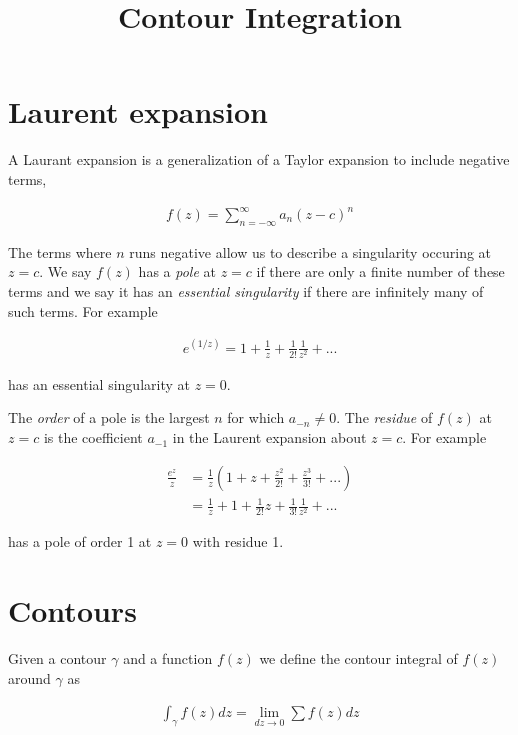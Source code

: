 \documentclass{article}
\title{Contour Integration}
\date{}
\begin{document}
\maketitle

\section{Laurent expansion}

A Laurant expansion is a generalization of a Taylor expansion to include negative terms, 

\begin{align}
f(z) = \displaystyle\sum\limits_{n=-\infty}^{\infty} a_n(z-c)^n
\end{align}

The terms where $n$ runs negative allow us to describe a singularity occuring at $z=c$. We say $f(z)$ has a \emph{pole} at $z=c$ if there are only a finite number of these terms and we say it has an \emph{essential singularity} if there are infinitely many of such terms. For example

\begin{align}
e^{(1/z)} = 1 + \frac{1}{z} + \frac{1}{2!}\frac{1}{z^2} + ...
\end{align}

has an essential singularity at $z=0$.

The \emph{order} of a pole is the largest $n$ for which $a_{-n} \neq 0$. The \emph{residue} of $f(z)$ at $z=c$ is the coefficient $a_{-1}$ in the Laurent expansion about $z=c$. For example

\begin{align}
\frac{e^z}{z} &= \frac{1}{z}\left(1 + z + \frac{z^2}{2!} + \frac{z^3}{3!} + ...\right) \\
                &= \frac{1}{z} + 1 + \frac{1}{2!}z + \frac{1}{3!}\frac{1}{z^2} + ...
\end{align}

has a pole of order 1 at $z=0$ with residue 1.

\section{Contours}

Given a contour $\gamma$ and a function $f(z)$ we define the contour integral of $f(z)$ around $\gamma$ as

\begin{align}
\int_\gamma f(z) dz = \lim_{dz \rightarrow 0}\sum f(z) dz
\end{align}
\end{document}
